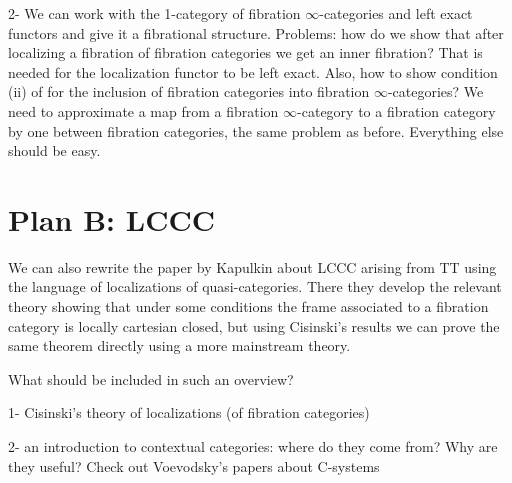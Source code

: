 \documentclass[a4paper,12pt,openany]{scrartcl}
\begin{document}
2- We can work with the 1-category of fibration $\infty$-categories and left exact functors and give it a fibrational structure. Problems: how do we show that after localizing a fibration of fibration categories we get an inner fibration? That is needed for the localization functor to be left exact. Also, how to show condition (ii) of \cite[Thm.\ 7.5.25]{Cis19} for the inclusion of fibration categories into fibration $\infty$-categories? We need to approximate a map from a fibration $\infty$-category to a fibration category by one between fibration categories, the same problem as before. Everything else should be easy.

\section{Plan B: LCCC}

We can also rewrite the paper by Kapulkin about LCCC arising from TT using the language of localizations of quasi-categories. There they develop the relevant theory showing that under some conditions the frame associated to a fibration category is locally cartesian closed, but using Cisinski's results we can prove the same theorem directly using a more mainstream theory.

What should be included in such an overview?

1- Cisinski's theory of localizations (of fibration categories)

2- an introduction to contextual categories: where do they come from? Why are they useful? Check out Voevodsky's papers about C-systems

\printbibliography
\end{document}
